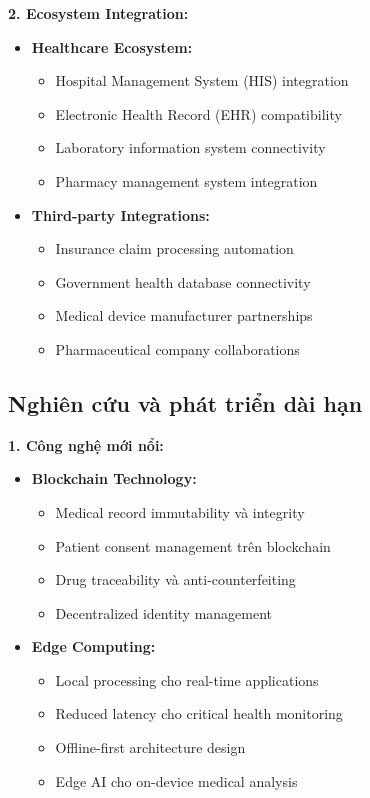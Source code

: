 \documentclass[../DoAn.tex]{subfiles}
\begin{document}
\textbf{2. Ecosystem Integration:}
\begin{itemize}
    \item \textbf{Healthcare Ecosystem:}
    \begin{itemize}
        \item Hospital Management System (HIS) integration
        \item Electronic Health Record (EHR) compatibility
        \item Laboratory information system connectivity
        \item Pharmacy management system integration
    \end{itemize}
    
    \item \textbf{Third-party Integrations:}
    \begin{itemize}
        \item Insurance claim processing automation
        \item Government health database connectivity
        \item Medical device manufacturer partnerships
        \item Pharmaceutical company collaborations
    \end{itemize}
\end{itemize}

\subsection{Nghiên cứu và phát triển dài hạn}

\textbf{1. Công nghệ mới nổi:}
\begin{itemize}
    \item \textbf{Blockchain Technology:}
    \begin{itemize}
        \item Medical record immutability và integrity
        \item Patient consent management trên blockchain
        \item Drug traceability và anti-counterfeiting
        \item Decentralized identity management
    \end{itemize}
    
    \item \textbf{Edge Computing:}
    \begin{itemize}
        \item Local processing cho real-time applications
        \item Reduced latency cho critical health monitoring
        \item Offline-first architecture design
        \item Edge AI cho on-device medical analysis
    \end{itemize}
\end{itemize}
\end{document}
